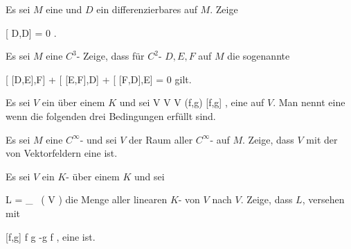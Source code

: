 {}
{

Es sei $M$ eine
und $D$ ein differenzierbares
auf $M$. Zeige

\mavergleichskette
{\vergleichskette
{ [ D,D]
}
{ = }{ 0
}
{  }{
}
{    }{
}
{   }{
}
}
{}{}{.}

}
{} {}

{}
{

Es sei $M$ eine
$C^3$-
Zeige, dass für
$C^2$-
$D,E,F$ auf $M$ die sogenannte  {}

\mavergleichskettedisp
{\vergleichskette
{ [ [D,E],F] + [ [E,F],D] + [ [F,D],E]
}
{ =} { 0
}
{ } {
}
{ } {
}
{ } {
}
}
{}{}{}
gilt.

}
{} {}

Es sei $V$ ein
über einem
$K$ und sei
\maabbeledisp {} {V \times V} { V
} {(f,g)} { [f,g]
} {,}
eine
auf $V$. Man nennt
 eine
wenn die folgenden drei Bedingungen erfüllt sind.

{}
{

Es sei $M$ eine
$C^\infty$-
und sei $V$ der Raum aller
$C^\infty$-
auf $M$. Zeige, dass  $V$ mit der
von Vektorfeldern eine
ist.

}
{} {}

{}
{

Es sei $V$ ein
$K$-
über einem
$K$ und sei

\mavergleichskettedisp
{\vergleichskette
{ L
}
{ =} { _{  } \, ( V )
}
{ } {
}
{ } {
}
{ } {
}
}
{}{}{}
die Menge aller linearen
$K$-
von $V$ nach $V$. Zeige, dass $L$, versehen mit

\mavergleichskettedisp
{\vergleichskette
{ [f,g]
}
{ } { f \circ g -g \circ f
}
{ } {
}
{ } {
}
{ } {
}
}
{}{}{,}
eine
ist.

}
{} {}


